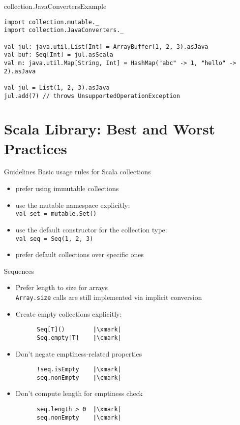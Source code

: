 \documentclass[aspectratio=169]{beamer}
\begin{document}
\begin{frame}[fragile]{collection.JavaConverters}{Example}
\begin{verbatim}
import collection.mutable._
import collection.JavaConverters._

val jul: java.util.List[Int] = ArrayBuffer(1, 2, 3).asJava
val buf: Seq[Int] = jul.asScala
val m: java.util.Map[String, Int] = HashMap("abc" -> 1, "hello" -> 2).asJava

val jul = List(1, 2, 3).asJava
jul.add(7) // throws UnsupportedOperationException
\end{verbatim}
\end{frame}

\section{Scala Library: Best and Worst Practices}

\begin{frame}[fragile]{Guidelines}
  Basic usage rules for Scala collections \cite{twitter1}
  \pause
  \begin{itemize}
    \item prefer using immutable collections
      \pause
    \item use the mutable namespace explicitly: \\
      \texttt{val set = mutable.Set()}
      \pause
    \item use the default constructor for the collection type: \\
      \texttt{val seq = Seq(1, 2, 3)}
      \pause
    \item prefer default collections over specific ones
  \end{itemize}
\end{frame}

\begin{frame}[fragile]{Sequences}
  \begin{itemize}
    \item Prefer length to size for arrays\\
      \texttt{Array.size} calls are still implemented via implicit conversion
      \pause
    \item Create empty collections explicitly: \\
      \begin{verbatim}
      Seq[T]()        |\xmark|
      Seq.empty[T]    |\cmark|
      \end{verbatim}
      \pause
    \item Don’t negate emptiness-related properties \\
      \begin{verbatim}
      !seq.isEmpty    |\xmark|
      seq.nonEmpty    |\cmark|
      \end{verbatim}
      \pause
    \item Don’t compute length for emptiness check \\
      \begin{verbatim}
      seq.length > 0  |\xmark|
      seq.nonEmpty    |\cmark|
      \end{verbatim}
  \end{itemize}
\end{frame}
\end{document}
